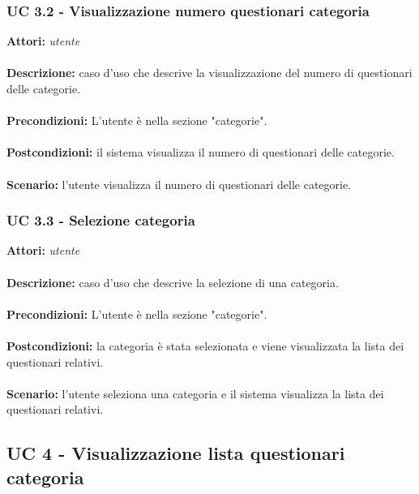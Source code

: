 \documentclass[a4paper,11pt]{article}
\begin{document}
\subsubsection{UC 3.2 - Visualizzazione numero questionari categoria}

\textbf{Attori:} \textit{utente}
\\ \\
\textbf{Descrizione:} caso d'uso che descrive la visualizzazione del numero di questionari delle categorie.\\
\\
\textbf{Precondizioni:} L'utente è nella sezione "categorie".\\
\\
\textbf{Postcondizioni:} il sistema visualizza il numero di questionari delle categorie.\\
\\
\textbf{Scenario:} l’utente visualizza il numero di questionari delle categorie.\\


\subsubsection{UC 3.3 - Selezione categoria}

\textbf{Attori:} \textit{utente}
\\ \\
\textbf{Descrizione:} caso d'uso che descrive la selezione di una categoria.\\
\\
\textbf{Precondizioni:} L'utente è nella sezione "categorie".\\
\\
\textbf{Postcondizioni:} la categoria è stata selezionata e viene visualizzata la lista dei questionari relativi.\\
\\
\textbf{Scenario:} l’utente seleziona una categoria e il sistema visualizza la lista dei questionari relativi.\\


\newpage
\subsection{UC 4 - Visualizzazione lista questionari categoria}
\end{document}
